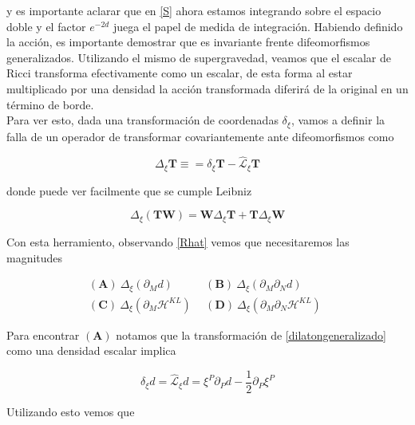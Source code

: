 \documentclass{article}
\numberwithin{equation}{section}
\begin{document}
y es importante aclarar que en \ref{S} ahora estamos integrando sobre el espacio doble y el factor $ e^{-2d} $ juega el papel de medida de integración. Habiendo definido la acción, es importante demostrar que es invariante frente difeomorfismos generalizados. Utilizando el mismo de supergravedad, veamos que el escalar de Ricci transforma efectivamente como un escalar, de esta forma al estar multiplicado por una densidad la acción transformada diferirá de la original en un término de borde.\\

Para ver esto, dada una transformación de coordenadas $ \delta_{\xi} $, vamos a definir la falla de un operador de transformar covariantemente ante difeomorfismos como

\begin{equation}\label{key}
\Delta_{\xi} \textbf{T} \equiv = \delta_{\xi} \textbf{T} - \hat{\mathcal{L}}_{\xi} \textbf{T}
\end{equation}

donde puede ver facilmente que se cumple Leibniz

\begin{equation}\label{key}
\Delta_{\xi} \left(\textbf{T}\textbf{W}\right) = \textbf{W}\Delta_{\xi} \textbf{T} + \textbf{T}\Delta_{\xi} \textbf{W}
\end{equation}

Con esta herramiento, observando \ref{Rhat} vemos que necesitaremos las magnitudes

\begin{equation}\label{key}
\begin{aligned}
(\textbf{A}) \ \Delta_{\xi}\left(\partial_M d \right) \ \ &  (\textbf{B}) \ \Delta_{\xi}\left(\partial_M \partial_N d \right) \ \ \\
(\textbf{C}) \ \Delta_{\xi}\left(\partial_M \mathcal{H}^{KL} \right) \ \ &  (\textbf{D}) \ \Delta_{\xi}\left(\partial_M\partial_N \mathcal{H}^{KL} \right) \ \
\end{aligned}
\end{equation}

Para encontrar $ (\textbf{A}) $ notamos que la transformación de \ref{dilatongeneralizado} como una densidad escalar implica

\begin{equation}\label{key}
\delta_{\xi} d = \hat{\mathcal{L}}_{\xi} d = \xi^P \partial_P d - \frac{1}{2}\partial_P\xi^P
\end{equation}

Utilizando esto vemos que 
\end{document}
